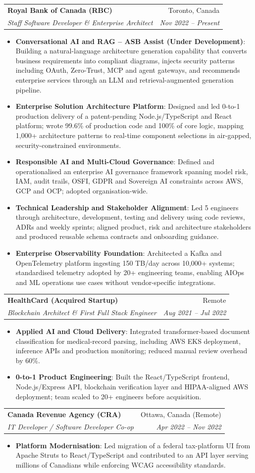 \documentclass[letterpaper,9.5pt]{article}
\makeatletter
\newcommand{\resumeItem}[2]{\item\small{\textbf{#1}{: #2 \vspace{-2pt}}}}
\newcommand{\resumeSubheading}[4]{\vspace{-2pt}\item\begin{tabular*}{0.97\textwidth}{l@{\extracolsep{\fill}}r}\textbf{#1} & #2 \\\textit{\small#3} & \textit{\small #4} \\\end{tabular*}\vspace{-6pt}}
\newcommand{\resumeItemListStart}{\begin{itemize}}
\newcommand{\resumeItemListEnd}{\end{itemize}\vspace{-6pt}}
\makeatother
\begin{document}
  \resumeSubheading
    {Royal Bank of Canada (RBC)}{Toronto, Canada}
    {Staff Software Developer \& Enterprise Architect}{Nov 2022 -- Present}
  \resumeItemListStart
    \resumeItem{Conversational AI and RAG -- ASB Assist (Under Development)}{Building a natural-language architecture generation capability that converts business requirements into compliant diagrams, injects security patterns including OAuth, Zero-Trust, MCP and agent gateways, and recommends enterprise services through an LLM and retrieval-augmented generation pipeline.}
    \resumeItem{Enterprise Solution Architecture Platform}{Designed and led 0-to-1 production delivery of a patent-pending Node.js/TypeScript and React platform; wrote 99.6\% of production code and 100\% of core logic, mapping 1,000+ architecture patterns to real-time component selections in air-gapped, security-constrained environments.}
    \resumeItem{Responsible AI and Multi-Cloud Governance}{Defined and operationalised an enterprise AI governance framework spanning model risk, IAM, audit trails, OSFI, GDPR and Sovereign AI constraints across AWS, GCP and OCP; adopted organisation-wide.}
    \resumeItem{Technical Leadership and Stakeholder Alignment}{Led 5 engineers through architecture, development, testing and delivery using code reviews, ADRs and weekly sprints; aligned product, risk and architecture stakeholders and produced reusable schema contracts and onboarding guidance.}
    \resumeItem{Enterprise Observability Foundation}{Architected a Kafka and OpenTelemetry platform ingesting 150 TB/day across 10,000+ systems; standardised telemetry adopted by 20+ engineering teams, enabling AIOps and ML operations use cases without vendor-specific integrations.}
  \resumeItemListEnd

  \resumeSubheading
    {HealthCard (Acquired Startup)}{Remote}
    {Blockchain Architect \& First Full Stack Engineer}{Aug 2021 -- Jul 2022}
  \resumeItemListStart
    \resumeItem{Applied AI and Cloud Delivery}{Integrated transformer-based document classification for medical-record parsing, including AWS EKS deployment, inference APIs and production monitoring; reduced manual review overhead by 60\%.}
    \resumeItem{0-to-1 Product Engineering}{Built the React/TypeScript frontend, Node.js/Express API, blockchain verification layer and HIPAA-aligned AWS deployment; team scaled to 20+ engineers before acquisition.}
  \resumeItemListEnd

  \resumeSubheading
    {Canada Revenue Agency (CRA)}{Ottawa, Canada (Remote)}
    {IT Developer / Software Developer Co-op}{Apr 2022 -- Nov 2022}
  \resumeItemListStart
    \resumeItem{Platform Modernisation}{Led migration of a federal tax-platform UI from Apache Struts to React/TypeScript and contributed to an API layer serving millions of Canadians while enforcing WCAG accessibility standards.}
  \resumeItemListEnd
\end{document}
